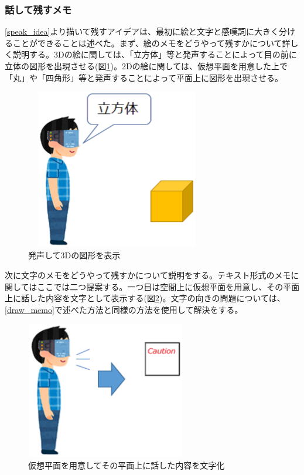 \documentclass[11pt,a4j, titlepage]{jarticle} %
\begin{document}
\subsubsection{話して残すメモ}
\ref{speak_idea}より描いて残すアイデアは、最初に絵と文字と感嘆詞に大きく分けることができることは述べた。まず、絵のメモをどうやって残すかについて詳しく説明する。3Dの絵に関しては、「立方体」等と発声することによって目の前に立体の図形を出現させる(図\ref{fig:speak_3d})。2Dの絵に関しては、仮想平面を用意した上で「丸」や「四角形」等と発声することによって平面上に図形を出現させる。

\begin{figure}[H]
  \begin{center}
    \includegraphics[clip,height=7.0cm,width=8.0cm]{./speak_3d.eps}
    \caption{発声して3Dの図形を表示}
    \label{fig:speak_3d}
  \end{center}
\end{figure}

次に文字のメモをどうやって残すかについて説明をする。テキスト形式のメモに関してはここでは二つ提案する。一つ目は空間上に仮想平面を用意し、その平面上に話した内容を文字として表示する(図\ref{fig:text_memo})。文字の向きの問題については、\ref{draw_memo}で述べた方法と同様の方法を使用して解決をする。

\begin{figure}[H]
  \begin{center}
    \includegraphics[clip,height=6.0cm,width=7.0cm]{./text_memo.eps}
    \caption{仮想平面を用意してその平面上に話した内容を文字化}
    \label{fig:text_memo}
  \end{center}
\end{figure}
\end{document}
